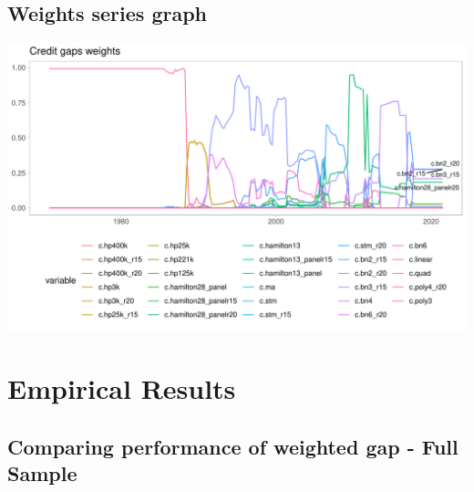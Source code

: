 \documentclass[
  12pt,
]{article}
\begin{document}
\hypertarget{weights-series-graph}{%
\subsection{Weights series graph}\label{weights-series-graph}}

\begin{center}\includegraphics[width=1\linewidth]{../Data/Output/Graphs/Weights_series} \end{center}

\hypertarget{empirical-results}{%
\section{Empirical Results}\label{empirical-results}}

\hypertarget{comparing-performance-of-weighted-gap---full-sample}{%
\subsection{Comparing performance of weighted gap - Full Sample}\label{comparing-performance-of-weighted-gap---full-sample}}
\end{document}
